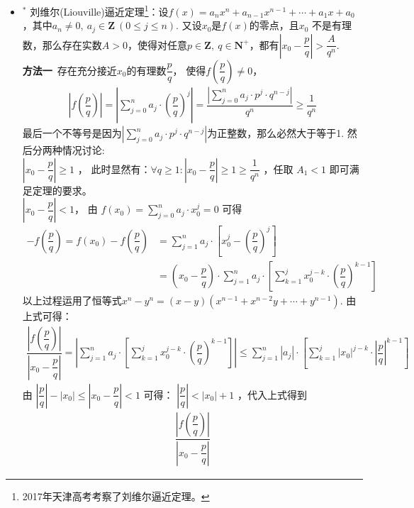 \begin{itemize}[leftmargin=\inteval{\myitemleftmargin}pt,itemsep=
   \inteval{\myitemitempsep}pt,topsep=\inteval{\myitemtopsep}pt]
\item $^*$ 刘维尔(Liouville)逼近定理\footnote{2017年天津高考考察了刘维尔逼近定理。}：设$ f(x)=a_nx^n+a_{n-1}x^{n-1}+
\cdots+a_1x+a_0 $，其中$ a_n\neq 0,\ a_j\in \textbf{Z}\ 
(0\leq j\leq n) $. 又设$ x_0 $是$ f(x) $的零点，且$ x_0 $
不是有理数，那么存在实数$ A>0 $，使得对任意$ p\in \textbf{Z},\ 
q\in \textbf{N}^+ $，都有$ \left|x_0-\dfrac{p}{q}\right|>
\dfrac{A}{q^n} $.\\
\textbf{方法一}\ 存在充分接近$ x_0 $的有理数$ \dfrac{p}{q} $，
使得$ f\left(\dfrac{p}{q}\right)\neq 0 $，
\begin{align*}
    \left|f\left(\dfrac{p}{q}\right)\right|=\left|\sum_{j=0}^{n}a_{j}\cdot \left(\dfrac{p}{q}\right)^{j}\right|=\dfrac{\left|\sum\limits_{j=0}^{n}a_{j}\cdot p^{j}\cdot q^{n-j}\right|}{q^{n}}\geq \dfrac{1}{q^{n}}
\end{align*}
最后一个不等号是因为$ \left|\sum\limits_{j=0}^{n}a_{j}\cdot p^{j}
\cdot q^{n-j}\right| $为正整数，那么必然大于等于1.
然后分两种情况讨论: \\
 $ \left|x_0-\dfrac{p}{q}\right|\geq 1 $ ，
此时显然有：$ \forall q\geq 1:\left|x_0-\dfrac{p}{q}\right|\geq 1\geq \dfrac{1}{q^{n}} $ ，任取 $ A_{1}<1 $ 即可满足定理的要求。\\
\mycircled{2} $ \left|x_0-\dfrac{p}{q}\right|<1 $，
由 $ f(x_0)=\sum\limits_{j=0}^{n}a_{j}\cdot x_0^{j}=0 $ 可得
\begin{align*}
    -f\left(\dfrac{p}{q}\right)=f(x_0)-f\left(\dfrac{p}{q}\right)
    &=\sum_{j=1}^{n}a_{j}\cdot\left[x_0^{j}-\left(\dfrac{p}{q}
    \right)^{j}\right] \\
    &=\left(x_0-\dfrac{p}{q}\right)\cdot 
    \sum_{j=1}^{n}a_{j}\cdot \left[\sum_{k=1}^{j}x_0^{j-k}\cdot
    \left(\dfrac{p}{q}\right)^{k-1}\right]
\end{align*}
以上过程运用了恒等式$ x^{n}-y^{n}=(x-y)(x^{n-1}+x^{n-2}y+\cdots+y^{n-1}) $. 由上式可得： 
\begin{align}\label{刘维尔定理1}
    \dfrac{\left|f\left(\dfrac{p}{q}\right)\right|}{\left|x_0-\dfrac{p}{q}\right|}=\left|\sum_{j=1}^{n}a_{j}\cdot \left[\sum_{k=1}^{j}x_0^{j-k}\cdot \left(\dfrac{p}{q}\right)^{k-1}\right]\right|\leq \sum_{j=1}^{n}\left|a_{j}\right|\cdot \left[\sum_{k=1}^{j}|x_0|^{j-k}\cdot \left|\dfrac{p}{q}\right|^{k-1}\right]
\end{align}
由 $ \left|\dfrac{p}{q}\right|-|x_0|\leq \left|x_0-\dfrac{p}{q}\right|<1 $ 可得：
$ \left|\dfrac{p}{q}\right|<|x_0|+1 $ ，代入上式得到
\begin{align*}
    \dfrac{\left|f\left(\dfrac{p}{q}\right)\right|}{\left|x_0-\dfrac{p}{q}\right|} 

\end{align*}
\end{itemize}
